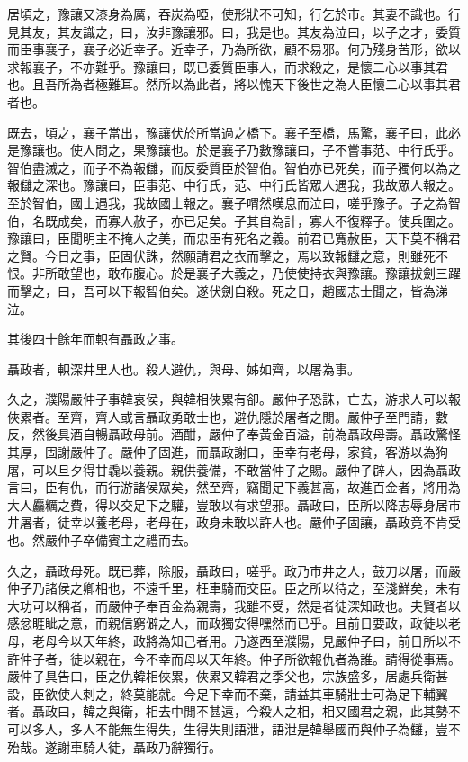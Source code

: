 居頃之，豫讓又漆身為厲，吞炭為啞，使形狀不可知，行乞於市。其妻不識也。行見其友，其友識之，曰，汝非豫讓邪。曰，我是也。其友為泣曰，以子之才，委質而臣事襄子，襄子必近幸子。近幸子，乃為所欲，顧不易邪。何乃殘身苦形，欲以求報襄子，不亦難乎。豫讓曰，既已委質臣事人，而求殺之，是懷二心以事其君也。且吾所為者極難耳。然所以為此者，將以愧天下後世之為人臣懷二心以事其君者也。

既去，頃之，襄子當出，豫讓伏於所當過之橋下。襄子至橋，馬驚，襄子曰，此必是豫讓也。使人問之，果豫讓也。於是襄子乃數豫讓曰，子不嘗事范、中行氏乎。智伯盡滅之，而子不為報讎，而反委質臣於智伯。智伯亦已死矣，而子獨何以為之報讎之深也。豫讓曰，臣事范、中行氏，范、中行氏皆眾人遇我，我故眾人報之。至於智伯，國士遇我，我故國士報之。襄子喟然嘆息而泣曰，嗟乎豫子。子之為智伯，名既成矣，而寡人赦子，亦已足矣。子其自為計，寡人不復釋子。使兵圍之。豫讓曰，臣聞明主不掩人之美，而忠臣有死名之義。前君已寬赦臣，天下莫不稱君之賢。今日之事，臣固伏誅，然願請君之衣而擊之，焉以致報讎之意，則雖死不恨。非所敢望也，敢布腹心。於是襄子大義之，乃使使持衣與豫讓。豫讓拔劍三躍而擊之，曰，吾可以下報智伯矣。遂伏劍自殺。死之日，趙國志士聞之，皆為涕泣。

其後四十餘年而軹有聶政之事。

聶政者，軹深井里人也。殺人避仇，與母、姊如齊，以屠為事。

久之，濮陽嚴仲子事韓哀侯，與韓相俠累有卻。嚴仲子恐誅，亡去，游求人可以報俠累者。至齊，齊人或言聶政勇敢士也，避仇隱於屠者之閒。嚴仲子至門請，數反，然後具酒自暢聶政母前。酒酣，嚴仲子奉黃金百溢，前為聶政母壽。聶政驚怪其厚，固謝嚴仲子。嚴仲子固進，而聶政謝曰，臣幸有老母，家貧，客游以為狗屠，可以旦夕得甘毳以養親。親供養備，不敢當仲子之賜。嚴仲子辟人，因為聶政言曰，臣有仇，而行游諸侯眾矣，然至齊，竊聞足下義甚高，故進百金者，將用為大人麤糲之費，得以交足下之驩，豈敢以有求望邪。聶政曰，臣所以降志辱身居市井屠者，徒幸以養老母，老母在，政身未敢以許人也。嚴仲子固讓，聶政竟不肯受也。然嚴仲子卒備賓主之禮而去。

久之，聶政母死。既已葬，除服，聶政曰，嗟乎。政乃市井之人，鼓刀以屠，而嚴仲子乃諸侯之卿相也，不遠千里，枉車騎而交臣。臣之所以待之，至淺鮮矣，未有大功可以稱者，而嚴仲子奉百金為親壽，我雖不受，然是者徒深知政也。夫賢者以感忿睚眦之意，而親信窮僻之人，而政獨安得嘿然而已乎。且前日要政，政徒以老母，老母今以天年終，政將為知己者用。乃遂西至濮陽，見嚴仲子曰，前日所以不許仲子者，徒以親在，今不幸而母以天年終。仲子所欲報仇者為誰。請得從事焉。嚴仲子具告曰，臣之仇韓相俠累，俠累又韓君之季父也，宗族盛多，居處兵衛甚設，臣欲使人刺之，終莫能就。今足下幸而不棄，請益其車騎壯士可為足下輔翼者。聶政曰，韓之與衛，相去中閒不甚遠，今殺人之相，相又國君之親，此其勢不可以多人，多人不能無生得失，生得失則語泄，語泄是韓舉國而與仲子為讎，豈不殆哉。遂謝車騎人徒，聶政乃辭獨行。

